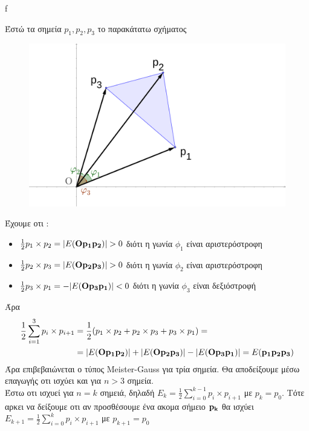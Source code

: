f\documentclass[12pt]{article}
\begin{document}
Έστώ τα σημεία $p_1,p_2,p_3$ το παρακάτατω σχήματος
\begin{figure}[H]

    \centering
    \includegraphics[scale = 1]{geogebra-export3.png}
\end{figure}
Έχουμε οτι :
\begin{itemize}
    \item $\frac{1}{2}p_1\times p_2 = |E({\bf Op_1p_2})|>0$ διότι η γωνία $\phi_1$ είναι αριστερόστροφη
    \item $\frac{1}{2}p_2\times p_3 = |E({\bf Op_2p_3})|>0$ διότι η γωνία $\phi_2$ είναι αριστερόστροφη
    \item $\frac{1}{2}p_3\times p_1 = -|E({\bf Op_3p_1})|<0$ διότι η γωνία $\phi_3$ είναι δεξιόστροφή
\end{itemize}

Άρα  
\begin{align*}
    \frac{1}{2}\sum_{i=1}^3 p_i\times p_{i+1} &=\frac{1}{2}(p_1\times p_2 + p_2\times p_3+ p_3\times p_1) =\\
    &=  |E({\bf Op_1p_2})| + |E({\bf Op_2p_3})| -|E({\bf Op_3p_1})| =E({\bf p_1p_2p_3}) 
\end{align*}
Άρα επιβεβαιώνεται ο τύπος \textlatin{Meister-Gauss} για τρία σημεία. Θα αποδείξουμε μέσω επαγωγής οτι ισχύει και για $n>3$ σημεία.\\
Έστω οτι ισχυεί για $n=k$ σημειά, δηλαδή $E_k =  \frac{1}{2}\sum_{i=0}^{k-1} p_i\times p_{i+1}$ με $p_k = p_0$. Tότε αρκει να δείξουμε οτι αν προσθέσουμε ένα ακομα σήμειο $\bf p_{k}$ θα ισχύει $E_{k+1} =  \frac{1}{2}\sum_{i=0}^{k} p_i\times p_{i+1}$ με $p_{k+1} = p_0$
\end{document}
